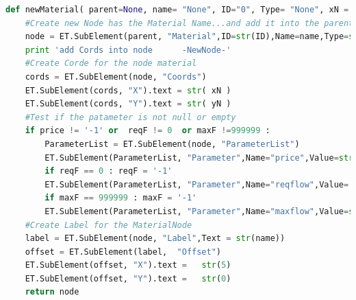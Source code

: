 \begin{lstlisting}[language=Python, caption=Python Function Material]
def newMaterial( parent=None, name= "None", ID="0", Type= "None", xN ='-1', yN ='-1' ,price='-1' ,reqF = 0 ,maxF =999999 ):
	#Create new Node has the Material Name...and add it into the parent node
	node = ET.SubElement(parent, "Material",ID=str(ID),Name=name,Type=str(Type))
    print 'add Cords into node		-NewNode-'
	#Create Corde for the node material
	cords = ET.SubElement(node, "Coords")
	ET.SubElement(cords, "X").text = str( xN )
	ET.SubElement(cords, "Y").text = str( yN )
	#Test if the patameter is not null or empty
	if price != '-1' or  reqF != 0  or maxF !=999999 : 
		ParameterList = ET.SubElement(node, "ParameterList")
		ET.SubElement(ParameterList, "Parameter",Name="price",Value=str( price) )
		if reqF == 0 : reqF = '-1'
		ET.SubElement(ParameterList, "Parameter",Name="reqflow",Value= str(reqF) )
		if maxF == 999999 : maxF = '-1'
		ET.SubElement(ParameterList, "Parameter",Name="maxflow",Value=str(maxF) )
	#Create Label for the MaterialNode
	label = ET.SubElement(node, "Label",Text = str(name))
	offset = ET.SubElement(label,  "Offset")
	ET.SubElement(offset, "X").text =   str(5)
	ET.SubElement(offset, "Y").text =   str(0)
	return node
\end{lstlisting}

